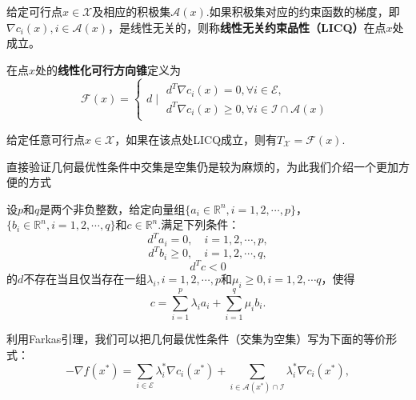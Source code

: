 \begin{definition}[线性无关约束品性LICQ]
	给定可行点$x\in\mathcal{X}$及相应的积极集$\mathcal{A}(x)$.如果积极集对应的约束函数的梯度，即$\nabla c_i(x), i\in\mathcal{A}(x)$，是线性无关的，则称\textbf{线性无关约束品性（LICQ）}在点$x$处成立。
\end{definition}
\begin{definition}[线性化可行方向锥]
	在点$x$处的\textbf{线性化可行方向锥}定义为
	\begin{equation*}
		\mathcal{F}(x) = \begin{cases}
			d\mid \begin{split}
				d^T\nabla c_i(x)=0,\forall i\in \mathcal{E},\\
				d^T\nabla c_i(x)\geq 0,\forall i\in \mathcal{I}\cap \mathcal{A}(x)
			\end{split}
		\end{cases}
	\end{equation*}
\end{definition}
\begin{lemma}
	给定任意可行点$x\in\mathcal{X}$，如果在该点处LICQ成立，则有$T_\mathcal{X} = \mathcal{F}(x).$
\end{lemma}
直接验证几何最优性条件中交集是空集仍是较为麻烦的，为此我们介绍一个更加方便的方式
\begin{lemma}[Farkas引理]
	设$p$和$q$是两个非负整数，给定向量组$\{a_i\in\mathbb{R}^n, i = 1,2,\cdots, p\}$，$\{b_i\in\mathbb{R}^n, i = 1,2,\cdots, q\}$和$c\in\mathbb{R}^n$.满足下列条件：
	\begin{equation*}
		d^Ta_i = 0,\quad i = 1, 2, \cdots, p,
	\end{equation*}
	\begin{equation*}
		d^Tb_i \geq 0,\quad i = 1, 2, \cdots, q,
	\end{equation*}
	\begin{equation*}
		d^Tc<0
	\end{equation*}
	的$d$不存在当且仅当存在一组$\lambda_i, i = 1,2,\cdots, p$和$\mu_i\geq 0,i = 1,2, \cdots q$，使得
	\begin{equation*}
		c = \sum\limits_{i=1}^p \lambda_ia_i + \sum\limits_{i=1}^q\mu_i b_i.
	\end{equation*}
\end{lemma}
利用Farkas引理，我们可以把几何最优性条件（交集为空集）写为下面的等价形式：
\begin{equation*}
	-\nabla f(x^*) = \sum\limits_{i\in \mathcal{E}}\lambda_i^* \nabla c_i(x^*)+\sum\limits_{i\in \mathcal{A}(x^*)\cap\mathcal{I}}\lambda_i^*\nabla c_i(x^*),
\end{equation*}
